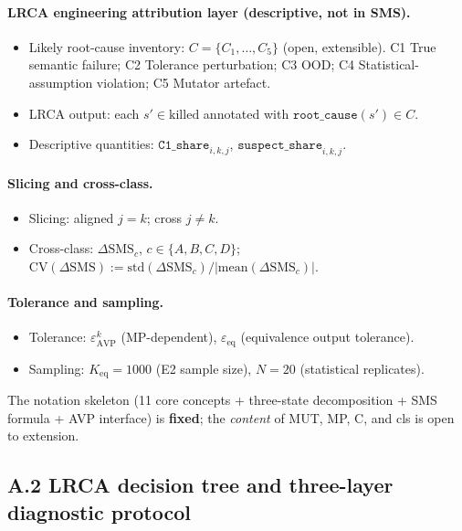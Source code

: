 \documentclass[acmsmall,screen,review]{acmart}
\begin{document}
\paragraph{LRCA engineering attribution layer (descriptive, not in SMS).}
\begin{itemize}
\item Likely root-cause inventory: $C = \{C_1, \ldots, C_5\}$ (open, extensible). C1 True semantic failure; C2 Tolerance perturbation; C3 OOD; C4 Statistical-assumption violation; C5 Mutator artefact.
\item LRCA output: each $s' \in \mathrm{killed}$ annotated with $\texttt{root\_cause}(s') \in C$.
\item Descriptive quantities: $\texttt{C1\_share}_{i,k,j}$, $\texttt{suspect\_share}_{i,k,j}$.
\end{itemize}

\paragraph{Slicing and cross-class.}
\begin{itemize}
\item Slicing: aligned $j = k$; cross $j \neq k$.
\item Cross-class: $\Delta\mathrm{SMS}_c$, $c \in \{A, B, C, D\}$; $\mathrm{CV}(\Delta\mathrm{SMS}) := \mathrm{std}(\Delta\mathrm{SMS}_c) / |\mathrm{mean}(\Delta\mathrm{SMS}_c)|$.
\end{itemize}

\paragraph{Tolerance and sampling.}
\begin{itemize}
\item Tolerance: $\varepsilon_{\mathrm{AVP}}^k$ (MP-dependent), $\varepsilon_{\mathrm{eq}}$ (equivalence output tolerance).
\item Sampling: $K_{\mathrm{eq}} = 1000$ (E2 sample size), $N = 20$ (statistical replicates).
\end{itemize}

The notation skeleton (11 core concepts + three-state decomposition +
SMS formula + AVP interface) is \textbf{fixed}; the \emph{content} of
MUT, MP, C, and cls is open to extension.

\subsection{A.2 LRCA decision tree and three-layer diagnostic protocol}\label{a.2-lrca-decision-tree-and-three-layer-diagnostic-protocol}
\end{document}
